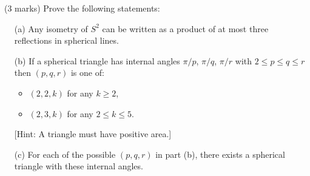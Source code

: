 \documentclass[12pt]{article}
\begin{document}
\begin{question}\ (3 marks)
  Prove the following statements:
  \begin{enumerate}
  \item[(a)] Any isometry of $S^2$ can be written as a product of at most three reflections in spherical lines.
  \item[(b)] If a spherical triangle has internal angles $\pi/p$, $\pi/q$, $\pi/r$ with $2\leq p\leq q\leq r$ then $(p,q,r)$ is one of:
    \begin{itemize}
    \item $(2,2,k)$ for any $k\geq 2$,
    \item $(2,3,k)$ for any $2\leq k\leq 5$.
    \end{itemize}
    [Hint: A triangle must have positive area.]
  \item[(c)] For each of the possible $(p,q,r)$ in part (b), there exists a spherical triangle with these internal angles.
  \end{enumerate}
\end{question}

\iffalse
\begin{answer}
  \begin{enumerate}
  \item[(a)] Any isometry of $S^2$ is a restriction of an orthogonal matrix in $O(3)$, which can be written as a product of three reflections by the result in lectures.
  \item[(b)] The Gauss-Bonnet theorem tells us that $\OP{area}=\pi\left(\frac{1}{p}+\frac{1}{q}+\frac{1}{r}\right)-\pi$ and area must be positive, so:
    \[\frac{1}{p}+\frac{1}{q}+\frac{1}{r}>1.\]
    Clearly $(2,2,k)$ is possible, $(2,3,k)$ is possible as long as $\frac{1}{k}>1/6$, i.e. $k<6$. The next possibility would be $p=2$, $q\geq 4$ which requires $r<4$, but $q\leq r$ so we have a contradiction. The only other possibility would be $p\geq 3$. But then $q,r\geq 3$, so $\frac{1}{p}+\frac{1}{q}+\frac{1}{r}\leq 1$, which is a contradiction.
  \item[(c)] In each case, we have a right-angle ($p=2$) so let's rotate to put this vertex at the north pole $P$ and make the two edges live in the $x$- and $y$-planes. Pick the point $Q_t$ on the edge in the $x$-plane at a distance $t$ from $P$ and consider the unique spherical line which passes through $Q_t$ meeting the $x$-plane at an angle $\pi/q$. This intersects the $y$-plane at a point $R_t$ which will be the final vertex of our triangle $\Delta_t$. When $t=\pi/2$ the internal angle at $R_t$ is $\pi/2$, independent of $q$. This gives us $(2,q,2)$ (which is $(2,2,k)$ after relabelling). For the other three triangles, allow $t$ to vary. The internal angle $\gamma_t$ at $R_t$ varies continuously between $\pi/2$ and $\pi-\pi/p-\pi/q$ as $t\to 0$ because the area of the triangle varies continuously and the area and the angle are related by $\gamma_t=\OP{area}(\Delta_t)+\pi-\pi/p-\pi/q$. In particular, for some values of $t$ the angle $\gamma_t$ takes on the values $\pi/3$, $\pi/4$, $pi/5$.
  \end{enumerate}
\end{answer}
\newpage
\fi
\end{document}
